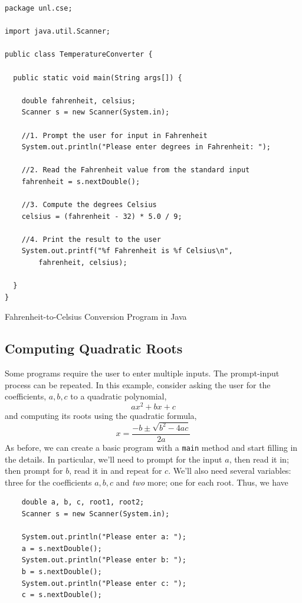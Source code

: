 \begin{listing}[H]
\begin{verbatim}
package unl.cse;

import java.util.Scanner;

public class TemperatureConverter {

  public static void main(String args[]) {

    double fahrenheit, celsius;
    Scanner s = new Scanner(System.in);

    //1. Prompt the user for input in Fahrenheit
    System.out.println("Please enter degrees in Fahrenheit: ");
      
    //2. Read the Fahrenheit value from the standard input
    fahrenheit = s.nextDouble();
      
    //3. Compute the degrees Celsius
    celsius = (fahrenheit - 32) * 5.0 / 9;
      
    //4. Print the result to the user
    System.out.printf("%f Fahrenheit is %f Celsius\n", 
    	fahrenheit, celsius);

  }
}
\end{verbatim}
\caption{Fahrenheit-to-Celsius Conversion Program in Java}
\label{code:java:fahrenheitToCelsiusProgram}
\end{listing}

\subsection{Computing Quadratic Roots}

Some programs require the user to enter multiple inputs.  The 
prompt-input process can be repeated.  In this example, consider asking
the user for the coefficients, $a, b, c$ to a quadratic polynomial, 
  $$ax^2 + bx + c$$
and computing its roots using the quadratic formula, 
  $$x = \frac{-b \pm \sqrt{b^2 - 4ac}}{2a}$$
As before, we can create a basic program with a \texttt{main}
method and start filling in the details.  In particular, we'll need to prompt
for the input $a$, then read it in; then prompt for $b$, read it in and
repeat for $c$.  We'll also need several variables: three for the coefficients
$a, b, c$ and \emph{two} more; one for each root.  Thus, we have 

\begin{verbatim}
    double a, b, c, root1, root2;
    Scanner s = new Scanner(System.in);

    System.out.println("Please enter a: ");
    a = s.nextDouble();
    System.out.println("Please enter b: ");
    b = s.nextDouble();
    System.out.println("Please enter c: ");
    c = s.nextDouble();
\end{verbatim}

